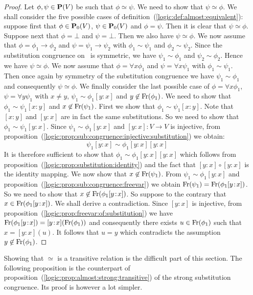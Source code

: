 \begin{proof}
Let $\phi,\psi\in\mbox{${\bf P}(V)$}$ be such that $\phi\simeq\psi$. We need to show
that $\psi\simeq\phi$. We shall consider the five possible cases of
definition~(\ref{logic:def:almost:equivalent}): suppose first that
$\phi\in\mbox{${\bf P}_{0}(V)$}$, $\psi\in\mbox{${\bf P}_{0}(V)$}$ and $\phi=\psi$. Then it is clear that
$\psi\simeq\phi$. Suppose next that $\phi=\bot$ and $\psi=\bot$.
Then we also have $\psi\simeq\phi$. We now assume that
$\phi=\phi_{1}\to\phi_{2}$ and $\psi=\psi_{1}\to\psi_{2}$ with
$\phi_{1}\sim\psi_{1}$ and $\phi_{2}\sim\psi_{2}$. Since the
substitution congruence on \pv\ is symmetric, we have
$\psi_{1}\sim\phi_{1}$ and $\psi_{2}\sim\phi_{2}$. Hence we have
$\psi\simeq\phi$. We now assume that $\phi=\forall x\phi_{1}$ and
$\psi=\forall x\psi_{1}$ with $\phi_{1}\sim\psi_{1}$. Then once
again by symmetry of the substitution congruence we have
$\psi_{1}\sim\phi_{1}$ and consequently $\psi\simeq\phi$. We finally
consider the last possible case of $\phi=\forall x\phi_{1}$,
$\psi=\forall y\psi_{1}$ with $x\neq y$,
$\psi_{1}\sim\phi_{1}[y\!:\!x]$ and $y\not\in\mbox{\rm Fr}(\phi_{1})$. We
need to show that $\phi_{1}\sim\psi_{1}[x\!:\!y]$ and
$x\not\in\mbox{\rm Fr}(\psi_{1})$. First we show that
$\phi_{1}\sim\psi_{1}[x\!:\!y]$. Note that $[x\!:\!y]$ and
$[y\!:\!x]$ are in fact the same substitutions. So we need to show
that $\phi_{1}\sim\psi_{1}[y\!:\!x]$. Since
$\psi_{1}\sim\phi_{1}[y\!:\!x]$ and $[y\!:\!x]:V\to V$ is injective,
from
proposition~(\ref{logic:prop:sub:congruence:injective:substitution})
we obtain:
    \[
    \psi_{1}[y\!:\!x]\sim\phi_{1}[y\!:\!x][y\!:\!x]
    \]
It is therefore sufficient to show that
$\phi_{1}\sim\phi_{1}[y\!:\!x][y\!:\!x]$ which follows from
proposition~(\ref{logic:prop:substitution:identity}) and the fact
that $[y\!:\!x]\circ[y\!:\!x]$ is the identity mapping. We now show
that $x\not\in\mbox{\rm Fr}(\psi_{1})$. From $\psi_{1}\sim\phi_{1}[y\!:\!x]$
and proposition~(\ref{logic:prop:sub:congruence:freevar}) we obtain
$\mbox{\rm Fr}(\psi_{1})=\mbox{\rm Fr}(\phi_{1}[y\!:\!x])$. So we need to show that
$x\not\in\mbox{\rm Fr}(\phi_{1}[y\!:\!x])$. So suppose to the contrary that
$x\in\mbox{\rm Fr}(\phi_{1}[y\!:\!x])$. We shall derive a contradiction.
Since $[y\!:\!x]$ is injective, from
proposition~(\ref{logic:prop:freevar:of:substitution}) we have
$\mbox{\rm Fr}(\phi_{1}[y\!:\!x])=[y\!:\!x](\mbox{\rm Fr}(\phi_{1}))$ and
consequently there exists $u\in\mbox{\rm Fr}(\phi_{1})$ such that
$x=[y\!:\!x](u)$. It follows that $u=y$ which contradicts the
assumption $y\not\in\mbox{\rm Fr}(\phi_{1})$.
\end{proof}

Showing that $\simeq$ is a transitive relation is the difficult part
of this section. The following proposition is the counterpart of
proposition~(\ref{logic:prop:almost:strong:transitive}) of the
strong substitution congruence. Its proof is however a lot simpler.


